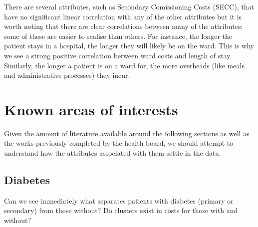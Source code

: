 \documentclass{article}
\begin{document}
There are several attributes, such as Secondary Comissioning Costs (SECC), that 
have no significant linear correlation with any of the other attributes but it 
is worth noting that there are clear correlations between many of the 
attributes; some of these are easier to realise than others. For instance, the 
longer the patient stays in a hospital, the longer they will likely be on the 
ward. This is why we see a strong positive correlation between ward costs and 
length of stay. Similarly, the longer a patient is on a ward for, the more 
overheads (like meals and administrative processes) they incur.

\section{Known areas of interests}\label{sec:known}

Given the amount of literature available around the following sections as well
as the works previously completed by the health board, we should attempt to
understand how the attributes associated with them settle in the data.

\subsection{Diabetes}\label{subsec:diabetes}

Can we see immediately what separates patients with diabetes (primary or
secondary) from those without? Do clusters exist in costs for those with and
without?
\end{document}
